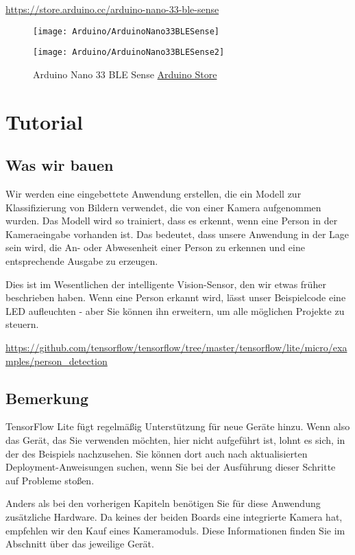 \url{https://store.arduino.cc/arduino-nano-33-ble-sense}


\begin{figure}[!h]
  \centering
  \texttt{[image: Arduino/ArduinoNano33BLESense]}
  
  \texttt{[image: Arduino/ArduinoNano33BLESense2]}
  
  \caption{Arduino Nano 33 BLE Sense \href{https://store.arduino.cc/arduino-nano-33-ble-sense}{Arduino Store}}
\end{figure}


\section{Tutorial}



\subsection{Was wir bauen}

Wir werden eine eingebettete Anwendung erstellen, die ein Modell zur Klassifizierung von Bildern verwendet, die von einer Kamera aufgenommen wurden. Das Modell wird so trainiert, dass es erkennt, wenn eine Person in der Kameraeingabe vorhanden ist. Das bedeutet, dass unsere Anwendung in der Lage sein wird, die An- oder Abwesenheit einer Person zu erkennen und eine entsprechende Ausgabe zu erzeugen.

Dies ist im Wesentlichen der intelligente Vision-Sensor, den wir etwas früher beschrieben haben. Wenn eine Person erkannt wird, lässt unser Beispielcode eine LED aufleuchten - aber Sie können ihn erweitern, um alle möglichen Projekte zu steuern.

\url{https://github.com/tensorflow/tensorflow/tree/master/tensorflow/lite/micro/examples/person_detection}


\subsection{Bemerkung}

TensorFlow Lite fügt regelmäßig Unterstützung für neue Geräte hinzu. Wenn also das Gerät, das Sie verwenden möchten, hier nicht aufgeführt ist, lohnt es sich, in der  des Beispiels nachzusehen. Sie können dort auch nach aktualisierten Deployment-Anweisungen suchen, wenn Sie bei der Ausführung dieser Schritte auf Probleme stoßen.


Anders als bei den vorherigen Kapiteln benötigen Sie für diese Anwendung zusätzliche Hardware. Da keines der beiden Boards eine integrierte Kamera hat, empfehlen wir den Kauf eines Kameramoduls. Diese Informationen finden Sie im Abschnitt über das jeweilige Gerät.

